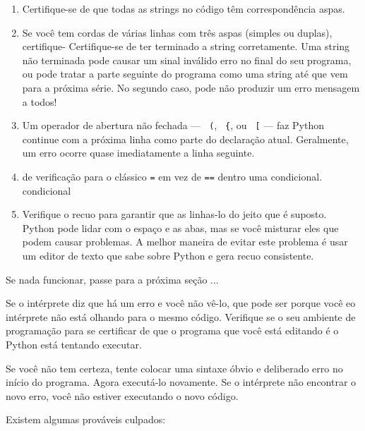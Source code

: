 \documentclass[10pt]{book}
\begin{document}
\begin{exercise}
\begin{v erbatim}
\begin{enumerate}
\item Certifique-se de que todas as strings no código têm correspondência
aspas.

\item Se você tem cordas de várias linhas com três aspas (simples ou duplas), certifique-
Certifique-se de ter terminado a string corretamente. Uma string não terminada
pode causar um sinal inválido {\tt} erro no final do seu programa,
ou pode tratar a parte seguinte do programa como uma string até que
vem para a próxima série. No segundo caso, pode não produzir um erro
mensagem a todos!

\item Um operador de abertura não fechada --- \verb + (+, \verb + {+, ou
  \Verb + [+ --- faz Python continue com a próxima linha como parte do
  declaração atual. Geralmente, um erro ocorre quase imediatamente
  a linha seguinte.

\item de verificação para o clássico {\tt =} em vez de {\tt ==} dentro
uma condicional.
\index{} condicional

\item Verifique o recuo para garantir que as linhas-lo do jeito que
é suposto. Python pode lidar com o espaço e as abas, mas se você misturar
eles que podem causar problemas. A melhor maneira de evitar este problema
é usar um editor de texto que sabe sobre Python e gera
recuo consistente.

\end{enumerate}

Se nada funcionar, passe para a próxima seção ...



Se o intérprete diz que há um erro e você não vê-lo, que
pode ser porque você eo intérprete não está olhando para o mesmo
código. Verifique se o seu ambiente de programação para se certificar de que o
programa que você está editando é o Python está tentando executar.

Se você não tem certeza, tente colocar uma sintaxe óbvio e deliberado
erro no início do programa. Agora executá-lo novamente. Se o
intérprete não encontrar o novo erro, você não estiver executando o
novo código.

Existem algumas prováveis ​​culpados:

\begin{itemize}


\end{itemize}
\end{v erbatim}
\end{exercise}
\end{document}
